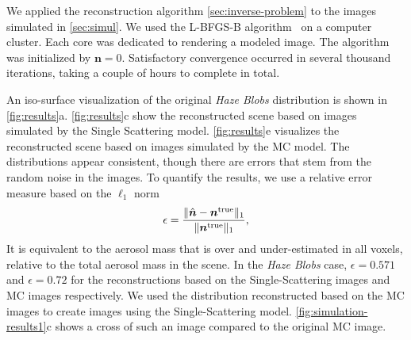\documentclass[10pt,letterpaper]{article}
\begin{document}
We applied the reconstruction algorithm \cref{sec:inverse-problem} to
the images simulated in \cref{sec:simul}. We used the L-BFGS-B
algorithm~\cite{BFGS} on a computer cluster. Each core was dedicated
to rendering a modeled image. The algorithm was initialized by ${\bm
  n}=0$. Satisfactory convergence occurred in several thousand
iterations, taking a couple of hours to complete in total.

An iso-surface visualization of the original {\em Haze Blobs}
distribution is shown in \cref{fig:results}a. \cref{fig:results}c show
the reconstructed scene based on images simulated by the Single
Scattering model. \cref{fig:results}e visualizes the reconstructed
scene based on images simulated by the MC model. The distributions
appear consistent, though there are errors that stem from the random
noise in the images. To quantify the results, we use a relative error
measure based on the $\ell_1$ norm
\begin{equation}
  \label{eq:ndiff}
  \epsilon=\frac{\| \hat{\bm n}  - {\bm n}^{\rm true} \|_1}
  {\| {\bm n}^{\rm true} \|_1} ,
\end{equation}
It is equivalent to the aerosol mass that is over and under-estimated
in all voxels, relative to the total aerosol mass in the scene.  In
the {\em Haze Blobs} case, $\epsilon=0.571$ and $\epsilon=0.72$ for
the reconstructions based on the Single-Scattering images and MC
images respectively. We used the distribution reconstructed based on
the MC images to create images using the Single-Scattering
model. \cref{fig:simulation-results1}c shows a cross of such an image
compared to the original MC image.
\end{document}
